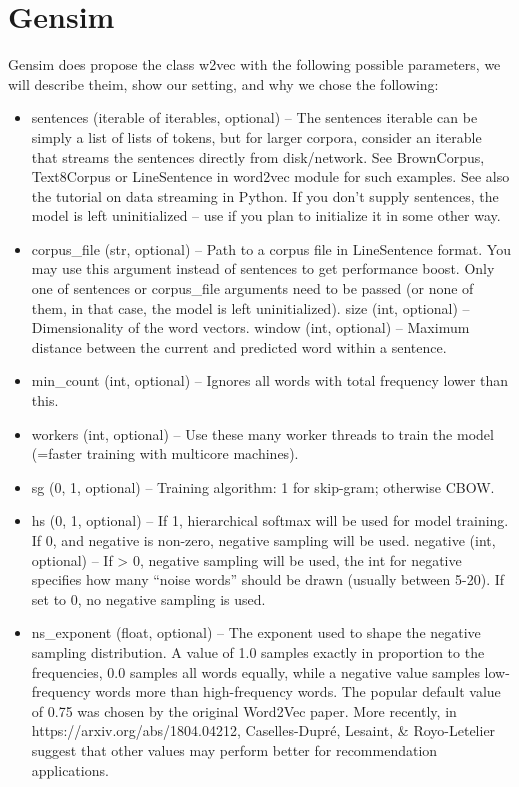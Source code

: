 \section{Gensim}
Gensim does propose the class w2vec with the following possible parameters, we will describe theim, show our setting, and why we chose the following: 
\begin{itemize}

   \item sentences (iterable of iterables, optional) – The sentences iterable can be simply a list of lists of tokens, but for larger corpora, consider an iterable that streams the sentences directly from disk/network. See BrownCorpus, Text8Corpus or LineSentence in word2vec module for such examples. See also the tutorial on data streaming in Python. If you don’t supply sentences, the model is left uninitialized – use if you plan to initialize it in some other way.
 \item   corpus\_file (str, optional) – Path to a corpus file in LineSentence format. You may use this argument instead of sentences to get performance boost. Only one of sentences or corpus\_file arguments need to be passed (or none of them, in that case, the model is left uninitialized).
    size (int, optional) – Dimensionality of the word vectors.
    window (int, optional) – Maximum distance between the current and predicted word within a sentence.
  \item  min\_count (int, optional) – Ignores all words with total frequency lower than this.
 \item   workers (int, optional) – Use these many worker threads to train the model (=faster training with multicore machines).
\item    sg ({0, 1}, optional) – Training algorithm: 1 for skip-gram; otherwise CBOW.
  \item  hs ({0, 1}, optional) – If 1, hierarchical softmax will be used for model training. If 0, and negative is non-zero, negative sampling will be used.
    negative (int, optional) – If > 0, negative sampling will be used, the int for negative specifies how many “noise words” should be drawn (usually between 5-20). If set to 0, no negative sampling is used.
\item    ns\_exponent (float, optional) – The exponent used to shape the negative sampling distribution. A value of 1.0 samples exactly in proportion to the frequencies, 0.0 samples all words equally, while a negative value samples low-frequency words more than high-frequency words. The popular default value of 0.75 was chosen by the original Word2Vec paper. More recently, in https://arxiv.org/abs/1804.04212, Caselles-Dupré, Lesaint, \& Royo-Letelier suggest that other values may perform better for recommendation applications.

\end{itemize}
